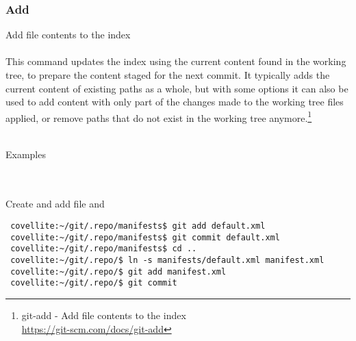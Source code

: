 
\subsubsection{Add}
Add file contents to the index
\\
\\
This command updates the index using the current content found in
the working tree, to prepare the content staged for the next
commit.  It typically adds the current content of existing paths
as a whole, but with some options it can also be used to add
content with only part of the changes made to the working tree
files applied, or remove paths that do not exist in the working
tree anymore.\footnote{git-add - Add file contents to the index\\
\href{https://git-scm.com/docs/git-add}{https://git-scm.com/docs/git-add}}
\\
\\

\noindent \begin{bf}Examples\end{bf}
\\
\\
\noindent Create and add  file and
\begin{Verbatim}
 covellite:~/git/.repo/manifests$ git add default.xml
 covellite:~/git/.repo/manifests$ git commit default.xml
 covellite:~/git/.repo/manifests$ cd ..
 covellite:~/git/.repo/$ ln -s manifests/default.xml manifest.xml
 covellite:~/git/.repo/$ git add manifest.xml
 covellite:~/git/.repo/$ git commit
\end{Verbatim}
